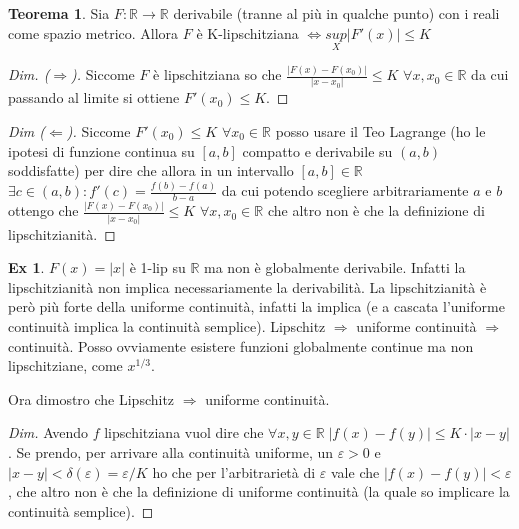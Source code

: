 \documentclass{article}
\theoremstyle{definition}
\newtheorem{theorem}{Teorema}[section]
\theoremstyle{definition}
\theoremstyle{definition}
\theoremstyle{definition}
\theoremstyle{definition}
\newtheorem{example}{Ex}[section]
\theoremstyle{definition}
\begin{document}
\begin{theorem}
    Sia $F:\mathbb{R} \rightarrow \mathbb{R}$ derivabile (tranne al più in qualche punto) con i reali come spazio metrico. Allora $F$ è K-lipschitziana $\Leftrightarrow \underset{X}{sup}\left|F'(x)\right|\leq K$
    \begin{proof}[Dim. ($\Rightarrow$)]
        Siccome $F$ è lipschitziana so che $\displaystyle{\frac{\left|F(x)-F(x_0)\right|}{\left|x-x_0\right|}\leq K}$ $\forall x,x_0 \in \mathbb{R}$ da cui passando al limite si ottiene $F'(x_0)\leq K$.
    \end{proof}
    \begin{proof}[Dim ($\Leftarrow$)]
        Siccome $F'(x_0)\leq K$ $\forall x_0 \in \mathbb{R}$ posso usare il Teo Lagrange (ho le ipotesi di funzione continua su $[a,b]$ compatto e derivabile su $(a,b)$ soddisfatte) per dire che allora in un intervallo $[a,b] \in \mathbb{R}$ $\exists c\in(a,b):f'(c)=\frac{f(b)-f(a)}{b-a}$ da cui potendo scegliere arbitrariamente $a$ e $b$ ottengo che $\frac{\left|F(x)-F(x_0)\right|}{\left|x-x_0\right|}\leq K$ $\forall x,x_0 \in \mathbb{R}$ che altro non è che la definizione di lipschitzianità.
    \end{proof}
\end{theorem}

\begin{example}
    $F(x)=\left|x\right|$ è 1-lip su $\mathbb{R}$ ma non è globalmente derivabile. Infatti la lipschitzianità non implica necessariamente la derivabilità. La lipschitzianità è però più forte della uniforme continuità, infatti la implica (e a cascata l'uniforme continuità implica la continuità semplice). Lipschitz $\Rightarrow$ uniforme continuità $\Rightarrow$ continuità. Posso ovviamente esistere funzioni globalmente continue ma non lipschitziane, come $x^{1/3}$.
    
    Ora dimostro che Lipschitz $\Rightarrow$ uniforme continuità.
    \begin{proof}[Dim]
        Avendo $f$ lipschitziana vuol dire che $\forall x,y\in\mathbb{R} \; \left|f(x)-f(y)\right| \leq K\cdot \left|x-y\right|$. Se prendo, per arrivare alla continuità uniforme, un $\varepsilon>0$ e $\left|x-y\right|<\delta(\varepsilon)=\varepsilon/K$ ho che per l'arbitrarietà di $\varepsilon$ vale che $\left|f(x)-f(y)\right| < \varepsilon$, che altro non è che la definizione di uniforme continuità (la quale so implicare la continuità semplice).
    \end{proof}
\end{example}
\end{document}
